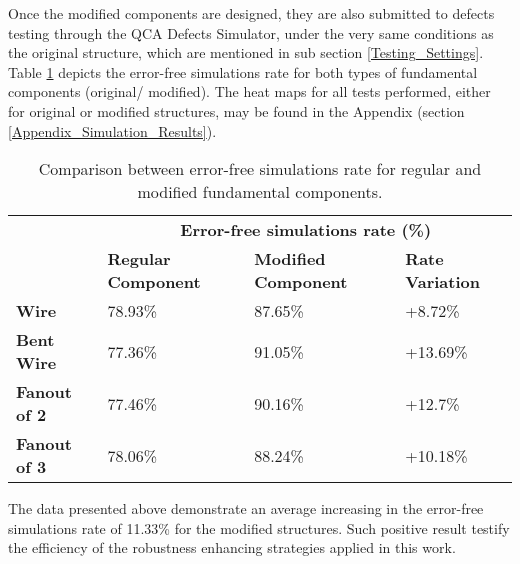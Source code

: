 Once the modified components are designed, they are also submitted to defects testing through the QCA Defects Simulator, under the very same conditions as the original structure, which are mentioned in sub section \ref{Testing_Settings}. Table \ref{table:fundamental_components_comparison} depicts the error-free simulations rate for both types of fundamental components (original/ modified). The heat maps for all tests performed, either for original or modified structures, may be found in the Appendix (section \ref{Appendix_Simulation_Results}).

\begin{table}[H]
\centering
\caption{Comparison between error-free simulations rate for regular and modified fundamental components.}
\label{table:fundamental_components_comparison}
\begin{tabular}{|l|l|l|l|}
\hline
\multirow{2}{*}{}    & \multicolumn{3}{c|}{\textbf{Error-free simulations rate (\%)}}                     \\ \cline{2-4} 
                     & \textbf{Regular Component} & \textbf{Modified Component} & \textbf{Rate Variation} \\ \hline
\textbf{Wire}        & 78.93\%                    & 87.65\%                     & +8.72\%                 \\ \hline
\textbf{Bent Wire}   & 77.36\%                    & 91.05\%                     & +13.69\%                \\ \hline
\textbf{Fanout of 2} & 77.46\%                    & 90.16\%                     & +12.7\%                 \\ \hline
\textbf{Fanout of 3} & 78.06\%                    & 88.24\%                     & +10.18\%                \\ \hline
\end{tabular}
\end{table}

The data presented above demonstrate an average increasing in the error-free simulations rate of 11.33\% for the modified structures. Such positive result testify the efficiency of the robustness enhancing strategies applied in this work.


%

